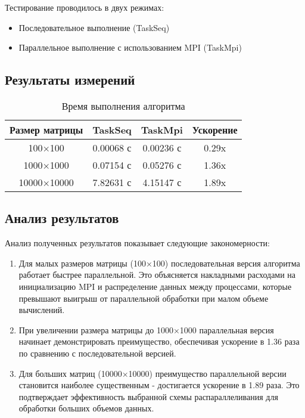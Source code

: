 \documentclass[14pt]{extarticle}
\theoremstyle{definition}
\theoremstyle{remark}
\begin{document}
Тестирование проводилось в двух режимах:
\begin{itemize}
    \item Последовательное выполнение (TaskSeq)
    \item Параллельное выполнение с использованием MPI (TaskMpi)
\end{itemize}

\subsection{Результаты измерений}
\begin{table}[h]
\centering
\begin{tabular}{|c|c|c|c|}
\hline
\textbf{Размер матрицы} & \textbf{TaskSeq} & \textbf{TaskMpi} & \textbf{Ускорение} \\
\hline
100×100 & 0.00068 с & 0.00236 с & 0.29x \\
1000×1000 & 0.07154 с & 0.05276 с & 1.36x \\
10000×10000 & 7.82631 с & 4.15147 с & 1.89x \\
\hline
\end{tabular}
\caption{Время выполнения алгоритма}
\label{tab:execution_time}
\end{table}

\subsection{Анализ результатов}
Анализ полученных результатов показывает следующие закономерности:

\begin{enumerate}
    \item Для малых размеров матрицы (100×100) последовательная версия алгоритма работает быстрее параллельной. Это объясняется накладными расходами на инициализацию MPI и распределение данных между процессами, которые превышают выигрыш от параллельной обработки при малом объеме вычислений.
    
    \item При увеличении размера матрицы до 1000×1000 параллельная версия начинает демонстрировать преимущество, обеспечивая ускорение в 1.36 раза по сравнению с последовательной версией.
    
    \item Для больших матриц (10000×10000) преимущество параллельной версии становится наиболее существенным - достигается ускорение в 1.89 раза. Это подтверждает эффективность выбранной схемы распараллеливания для обработки больших объемов данных.
\end{enumerate}
\end{document}
